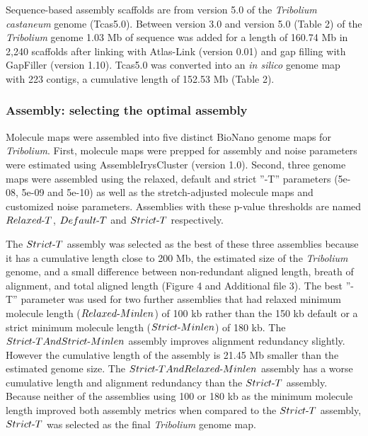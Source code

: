 \documentclass{bmcart}
\begin{document}
Sequence-based assembly scaffolds are from version 5.0 of the \textit{Tribolium castaneum} genome (Tcas5.0). Between version 3.0 \cite{Beetle2008} and version 5.0 (Table 2) of the \textit{Tribolium} genome 1.03 Mb of sequence was added for a length of 160.74 Mb in 2,240 scaffolds after linking with Atlas-Link (version 0.01) and gap filling with GapFiller (version 1.10). Tcas5.0 was converted into an \textit{in silico} genome map with 223 contigs, a cumulative length of 152.53 Mb (Table 2).

\subsubsection*{Assembly: selecting the optimal assembly}
Molecule maps were assembled into five distinct BioNano genome maps for \textit{Tribolium}. First, molecule maps were prepped for assembly and noise parameters were estimated using AssembleIrysCluster (version 1.0). Second, three genome maps were assembled using the relaxed, default and strict ”-T” parameters (5e-08, 5e-09 and 5e-10) as well as the stretch-adjusted molecule maps and customized noise parameters. Assemblies with these p-value thresholds are named $Relaxed\textnormal{-}T$, $Default\textnormal{-}T$ and $Strict\textnormal{-}T$ respectively. 

The $Strict\textnormal{-}T$ assembly was selected as the best of these three assemblies because it has a cumulative length close to 200 Mb, the estimated size of the \textit{Tribolium} genome, and a small difference between non-redundant aligned length, breath of alignment, and total aligned length (Figure 4 and Additional file 3). The best ”-T” parameter was used for two further assemblies that had relaxed minimum molecule length ($Relaxed\textnormal{-}Minlen$) of 100 kb rather than the 150 kb default or a strict minimum molecule length ($Strict\textnormal{-}Minlen$) of 180 kb. The $Strict\textnormal{-}TAndStrict\textnormal{-}Minlen$ assembly improves alignment redundancy slightly. However the cumulative length of the assembly is 21.45 Mb smaller than the estimated genome size. The $Strict\textnormal{-}TAndRelaxed\textnormal{-}Minlen$ assembly has a worse cumulative length and alignment redundancy than the $Strict\textnormal{-}T$ assembly. Because neither of the assemblies using 100 or 180 kb as the minimum molecule length improved both assembly metrics when compared to the $Strict\textnormal{-}T$ assembly, $Strict\textnormal{-}T$ was selected as the final \textit{Tribolium} genome map.
\end{document}
